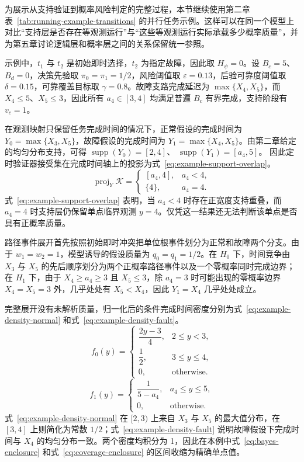 \documentclass[master,fontset=ubuntu]{shnuthesis}
\theoremstyle{definition}
\begin{document}
为展示从支持验证到概率风险判定的完整过程，本节继续使用第二章表~\ref{tab:running-example-transitions} 的并行任务示例。这样可以在同一个模型上对比“支持层是否存在等观测运行”与“这些等观测运行实际承载多少概率质量”，并为第五章讨论逻辑层和概率层之间的关系保留统一参照。

示例中，\(t_1\) 与 \(t_2\) 是初始即时选择，\(t_2\) 为指定故障，因此取 \(H_\psi=0\)。设 \(B_c=5\)、\(B_d=0\)，决策先验取 \(\pi_0=\pi_1=1/2\)，风险阈值取 \(\varepsilon=0.13\)，后验可靠度阈值取 \(\delta=0.15\)，可靠覆盖目标取 \(\gamma=0.8\)。故障支路完成延迟为 \(\max\{X_4,X_5\}\)，而 \(X_4\leq5\)、\(X_5\leq3\)，因此所有 \(a_4\in[3,4]\) 均满足普遍 \(B_c\) 有界完成，支持阶段有 \(v_c=1\)。

在观测映射只保留任务完成时间的情况下，正常假设的完成时间为 \(Y_0=\max\{X_3,X_5\}\)，故障假设的完成时间为 \(Y_1=\max\{X_4,X_5\}\)。由第二章给定的均匀分布支持，可得
\(\operatorname{supp}(Y_0)=[2,4]\)、
\(\operatorname{supp}(Y_1)=[a_4,5]\)。
因此定时验证器接受集在完成时间轴上的投影为式~\eqref{eq:example-support-overlap}。
\begin{equation}
\operatorname{proj}_Y\mathcal K
=
\begin{cases}
[a_4,4], & a_4<4,\\
\{4\}, & a_4=4.
\end{cases}
\label{eq:example-support-overlap}
\end{equation}
式~\eqref{eq:example-support-overlap} 表明，当 \(a_4<4\) 时存在正宽度支持重叠，而 \(a_4=4\) 时支持层仍保留单点临界观测 \(y=4\)。仅凭这一结果还无法判断该单点是否具有正概率质量。

路径事件展开首先按照初始即时冲突把单位根事件划分为正常和故障两个分支。由于 \(w_1=w_2=1\)，模型诱导的假设质量为 \(q_0=q_1=1/2\)。在 \(H_0\) 下，时间竞争由 \(X_3\) 与 \(X_5\) 的先后顺序划分为两个正概率路径事件以及一个零概率同时完成边界；在 \(H_1\) 下，由于 \(X_4\geq a_4\geq3\) 且 \(X_5\leq3\)，除 \(a_4=3\) 时可能出现的零概率边界 \(X_4=X_5=3\) 外，几乎处处有 \(X_5<X_4\)，因此 \(Y_1=X_4\) 几乎处处成立。

完整展开没有未解析质量，归一化后的条件完成时间密度分别为式~\eqref{eq:example-density-normal} 和式~\eqref{eq:example-density-fault}。
\begin{equation}
f_0(y)
=
\begin{cases}
\dfrac{2y-3}{4}, & 2\leq y<3,\\
\dfrac{1}{2}, & 3\leq y\leq4,\\
0, & \mathrm{otherwise}.
\end{cases}
\label{eq:example-density-normal}
\end{equation}
\begin{equation}
f_1(y)
=
\begin{cases}
\dfrac{1}{5-a_4}, & a_4\leq y\leq5,\\
0, & \mathrm{otherwise}.
\end{cases}
\label{eq:example-density-fault}
\end{equation}
式~\eqref{eq:example-density-normal} 在 \([2,3)\) 上来自 \(X_3\) 与 \(X_5\) 的最大值分布，在 \([3,4]\) 上则简化为常数 \(1/2\)；式~\eqref{eq:example-density-fault} 说明故障假设下完成时间与 \(X_4\) 的均匀分布一致。两个密度均积分为 1，因此在本例中式~\eqref{eq:bayes-enclosure} 和式~\eqref{eq:coverage-enclosure} 的区间收缩为精确单点值。
\end{document}

